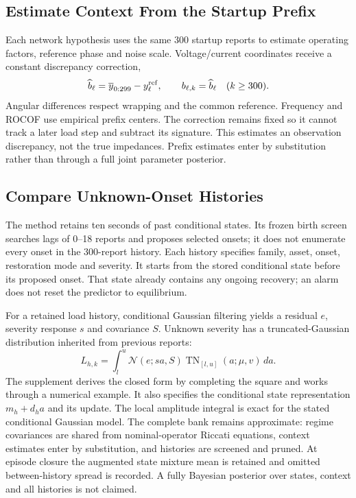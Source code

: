 \subsection{Estimate Context From the Startup Prefix}

Each network hypothesis uses the same 300 startup reports to estimate
operating factors, reference phase and noise scale. Voltage/current
coordinates receive a constant discrepancy correction,
\begin{equation}
 \widehat b_\ell=\overline y_{0:299}-y_\ell^{\rm ref},
 \qquad b_{\ell,k}=\widehat b_\ell\quad(k\ge300).
 \label{eq:continuous-intercept}
\end{equation}
Angular differences respect wrapping and the common reference. Frequency
and ROCOF use empirical prefix centers. The correction remains fixed so it
cannot track a later load step and subtract its signature. This estimates
an observation discrepancy, not the true impedances. Prefix estimates
enter by substitution rather than through a full joint parameter posterior.

\subsection{Compare Unknown-Onset Histories}

The method retains ten seconds of past conditional states. Its frozen
birth screen searches lags of 0--18 reports and proposes selected onsets;
it does not enumerate every onset in the 300-report history.
Each history specifies family, asset, onset,
restoration mode and severity. It starts from the stored conditional state
before its proposed onset. That state already contains any ongoing
recovery; an alarm does not reset the predictor to equilibrium.

For a retained load history, conditional Gaussian filtering yields a
residual $e$, severity response $s$ and covariance $S$. Unknown severity
has a truncated-Gaussian distribution inherited from previous reports:
\begin{equation}
 L_{h,k}=\int_l^u \mathcal N(e;sa,S)
             \operatorname{TN}_{[l,u]}(a;\mu,v)\,da.
 \label{eq:narrative-evidence}
\end{equation}
The supplement derives the closed form by completing the square and
works through a numerical example. It also specifies the conditional
state representation $m_h+d_h a$ and its update. The local amplitude
integral is exact for the stated conditional Gaussian model. The complete
bank remains approximate: regime covariances are shared from
nominal-operator Riccati equations, context estimates enter by substitution,
and histories are screened and pruned. At episode closure the augmented
state mixture mean is retained and omitted between-history spread is recorded.
A fully Bayesian posterior over states, context and all histories is not claimed.

